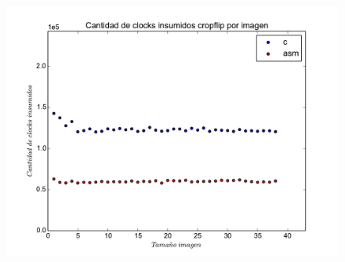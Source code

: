 \begin{figure}
  \begin{center}
	\includegraphics[scale=0.5]{cropflipallfijo.pdf}
  \end{center}
\end{figure}



